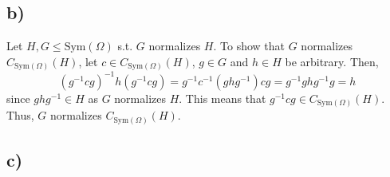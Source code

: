 \subsection*{b)}
Let $H,G \leq \text{Sym}(\Omega)$ s.t. $G$ normalizes $H$. To show that $G$ normalizes $C_{\text{Sym}(\Omega)}(H)$, let $c \in C_{\text{Sym}(\Omega)}(H)$, $g \in G$ and $h \in H$ be arbitrary. Then,
\[ (g^{-1}cg)^{-1}h(g^{-1}cg) = g^{-1}c^{-1}(ghg^{-1})cg = g^{-1}ghg^{-1}g = h \]
since $ghg^{-1} \in H$ as $G$ normalizes $H$. This means that $g^{-1}cg \in C_{\text{Sym}(\Omega)}(H)$. Thus, $G$ normalizes $C_{\text{Sym}(\Omega)}(H)$.

\subsection*{c)}
